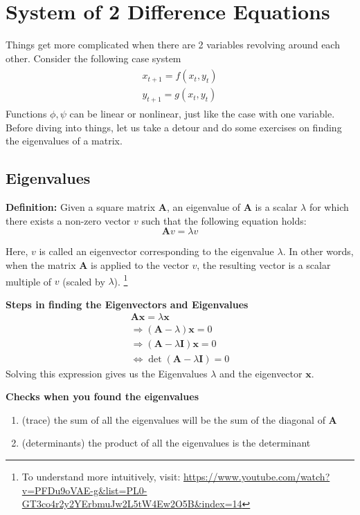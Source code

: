 \documentclass[11pt,a4paper]{book}
\theoremstyle{definition}\newtheorem{definition}{Definition}
\theoremstyle{definition}\newtheorem{fact}{Fact}
\theoremstyle{definition}\newtheorem{remark}{Remark}
\theoremstyle{definition}\newtheorem{ex}{Ex.}
\theoremstyle{definition}\newtheorem{project}{Project}
\theoremstyle{definition}\newtheorem{problem}{Problem}
\theoremstyle{definition}\newtheorem{example}{Example}
\numberwithin{theorem}{section}
\numberwithin{corollary}{chapter}
\numberwithin{assumption}{chapter}
\numberwithin{definition}{chapter}
\numberwithin{prop}{chapter}
\numberwithin{notation}{chapter}
\numberwithin{problem}{chapter}
\numberwithin{example}{chapter}
\numberwithin{fact}{chapter}
\numberwithin{ex}{chapter}
\def\A{\mathbf A}
\def\I{\mathbf I}
\def\x{\mathbf x}
\begin{document}
	\section{System of 2 Difference Equations}
	Things get more complicated when there are 2 variables revolving around each other. Consider the following case system
	\begin{align}
		\begin{matrix}
			x_{t+1} = f (x_t, y_t) \\
			y_{t+1} = g (x_t, y_t)
		\end{matrix} \label{sys_nonlin}
	\end{align}
	Functions $\phi, \psi$ can be linear or nonlinear, just like the case with one variable. Before diving into things, let us take a detour and do some exercises on finding the eigenvalues of a matrix.
	
	\subsection{Eigenvalues}
	\textbf{Definition:}
	Given a square matrix $\A$, an eigenvalue of $\A$ is a scalar $\lambda$ for which there exists a non-zero vector $v$ such that the following equation holds:
	\[ \A v = \lambda v \]
	
	Here, $v$ is called an eigenvector corresponding to the eigenvalue $\lambda$. In other words, when the matrix $\A$ is applied to the vector $v$, the resulting vector is a scalar multiple of $v$ (scaled by $\lambda$). \footnote{To understand more intuitively, visit: \url{https://www.youtube.com/watch?v=PFDu9oVAE-g&list=PL0-GT3co4r2y2YErbmuJw2L5tW4Ew2O5B&index=14} }
	
	\textbf{Steps in finding the Eigenvectors and Eigenvalues}
	\begin{align*}
		\A \x = \lambda \x                   \\
		\Rightarrow (\A - \lambda) \x = 0    \\
		\Rightarrow (\A - \lambda \I) \x = 0 \\
		\iff \det (\A - \lambda \I) = 0      
	\end{align*}
	Solving this expression gives us the Eigenvalues $\lambda$ and the eigenvector $\x$.
	
	\textbf{Checks when you found the eigenvalues}
	\begin{enumerate}
		\item (trace) the sum of all the eigenvalues will be the sum of the diagonal of $\A$
		\item (determinants) the product of all the eigenvalues is the determinant
	\end{enumerate}
	
\end{document}
